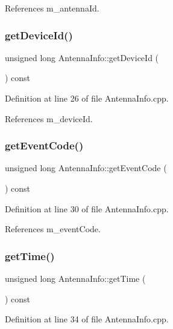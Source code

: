 References m\+\_\+antenna\+Id.

\mbox{\label{class_antenna_info_a25a6a3ca6afeba45c00f2312b8d2d9de}} 
\subsubsection{get\+Device\+Id()}
{\footnotesize\ttfamily unsigned long Antenna\+Info\+::get\+Device\+Id (\begin{DoxyParamCaption}{ }\end{DoxyParamCaption}) const}



Definition at line 26 of file Antenna\+Info.\+cpp.



References m\+\_\+device\+Id.

\mbox{\label{class_antenna_info_a898d46ed6fd2676e370ae8c325ffd679}} 
\subsubsection{get\+Event\+Code()}
{\footnotesize\ttfamily unsigned long Antenna\+Info\+::get\+Event\+Code (\begin{DoxyParamCaption}{ }\end{DoxyParamCaption}) const}



Definition at line 30 of file Antenna\+Info.\+cpp.



References m\+\_\+event\+Code.

\mbox{\label{class_antenna_info_aaae1e1105ba4a724c0061e3f7904b1e5}} 
\subsubsection{get\+Time()}
{\footnotesize\ttfamily unsigned long Antenna\+Info\+::get\+Time (\begin{DoxyParamCaption}{ }\end{DoxyParamCaption}) const}



Definition at line 34 of file Antenna\+Info.\+cpp.




